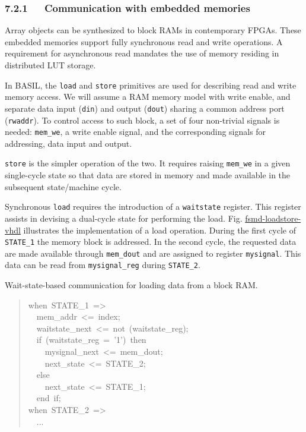 \documentclass[a4paper]{article}
\begin{document}
\subsubsection{7.2.1~~~Communication with embedded memories%
  \label{communication-with-embedded-memories}%
}

Array objects can be synthesized to block RAMs in contemporary FPGAs. These
embedded memories support fully synchronous read and write operations. A
requirement for asynchronous read mandates the use of memory residing in
distributed LUT storage.

In BASIL, the \texttt{load} and \texttt{store} primitives are used for describing read and
write memory access. We will assume a RAM memory model with write enable, and
separate data input (\texttt{din}) and output (\texttt{dout}) sharing a common address
port (\texttt{rwaddr}). To control access to such block, a set of four non-trivial
signals is needed: \texttt{mem\_we}, a write enable signal, and the corresponding
signals for addressing, data input and output.

\texttt{store} is the simpler operation of the two. It requires raising \texttt{mem\_we}
in a given single-cycle state so that data are stored in memory and made
available in the subsequent state/machine cycle.

Synchronous \texttt{load} requires the introduction of a \texttt{waitstate} register.
This register assists in devising a dual-cycle state for performing the load.
Fig. \hyperref[fsmd-loadstore-vhdl]{fsmd-loadstore-vhdl} illustrates the implementation of a load operation.
During the first cycle of \texttt{STATE\_1} the memory block is addressed. In the
second cycle, the requested data are made available through \texttt{mem\_dout} and
are assigned to register \texttt{mysignal}. This data can be read from
\texttt{mysignal\_reg} during \texttt{STATE\_2}.

\label{fsmd-loadstore-vhdl}
Wait-state-based communication for loading data from a block RAM.
%
\begin{quote}{\ttfamily \raggedright \noindent
when~STATE\_1~=>\\
~~mem\_addr~<=~index;\\
~~waitstate\_next~<=~not~(waitstate\_reg);\\
~~if~(waitstate\_reg~=~'1')~then\\
~~~~mysignal\_next~<=~mem\_dout;\\
~~~~next\_state~<=~STATE\_2;\\
~~else\\
~~~~next\_state~<=~STATE\_1;\\
~~end~if;\\
when~STATE\_2~=>\\
~~...
}
\end{quote}
\end{document}
